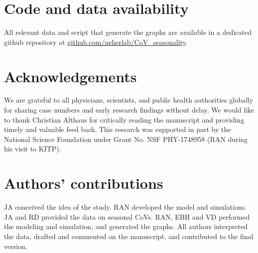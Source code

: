 \documentclass[rmp, reprint, superscriptaddress, floatfix,amsmath]{revtex4-1}
\begin{document}
\section{Code and data availability}
All relevant data and script that generate the graphs are available in a dedicated github repository at \url{github.com/neherlab/CoV_seasonality}.

\section*{Acknowledgements}
We are grateful to all physicians, scientists, and public health authorities globally for sharing case numbers and early research findings without delay. 
We would like to thank Christian Althaus for critically reading the manuscript and providing timely and valuable feed back. 
This research was supported in part by the National Science Foundation under Grant No. NSF PHY-1748958 (RAN during his visit to KITP).

\section*{Authors' contributions}
JA conceived the idea of the study. RAN developed the model and simulations. JA and RD provided the data on seasonal CoVs. RAN, EBH and VD performed the modeling and simulation, and generated the graphs. All authors interpreted the data, drafted and commented on the manuscript, and contributed to the final version. 



\newpage
\end{document}
